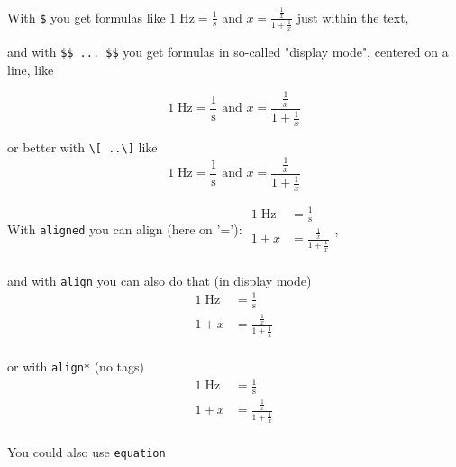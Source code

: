 \documentclass{ximera}
\begin{document}
\begin{example}\nl

    With \verb|$| you get formulas like 
$1\;\textrm{Hz}=\frac{1}{\textrm{s}}$ and $ x =\frac{\frac1x}{1+\frac{1}{x}}$
just within the text,

and with \verb|$$ ... $$| you get formulas in so-called "display mode", centered on a line, like

$$
1\;\textrm{Hz}=\frac{1}{\textrm{s}} \text{ and } x =\frac{\frac1x}{1+\frac{1}{x}}
$$ 

or better with \verb|\[ ..\]|  like
\[
1\;\textrm{Hz}=\frac{1}{\textrm{s}} \text{ and } x =\frac{\frac1x}{1+\frac{1}{x}}
\] 

With \verb|aligned| you can align (here on '='):
$
\begin{aligned}
    1\; \textrm{Hz}   & = \frac{1}{\textrm{s}}          \\
    1 + x             & = \frac{\frac1x}{1+\frac{1}{x}} \\
\end{aligned}
$,

and with \verb|align| you can also do that (in display mode)
\begin{align}
    1\; \textrm{Hz}   & = \frac{1}{\textrm{s}}          \\
    1 + x             & = \frac{\frac1x}{1+\frac{1}{x}} \\
\end{align}

or with \verb|align*| (no tags)
\begin{align*}
    1\; \textrm{Hz}   & = \frac{1}{\textrm{s}}          \\
    1 + x             & = \frac{\frac1x}{1+\frac{1}{x}} \\
\end{align*}



You could also use \verb|equation|


\end{example}
\end{document}
